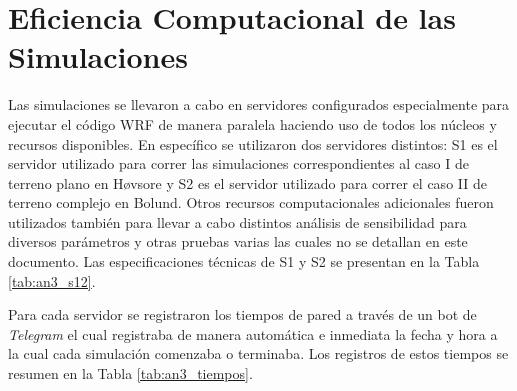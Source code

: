 \chapter{Eficiencia Computacional de las Simulaciones}
\label{apB}
Las simulaciones se llevaron a cabo en servidores configurados especialmente para ejecutar el código WRF de manera paralela haciendo uso de todos los núcleos y recursos disponibles. En específico se utilizaron dos servidores distintos: S1 es el servidor utilizado para correr las simulaciones correspondientes al caso I de terreno plano en Høvsore y S2 es el servidor utilizado para correr el caso II de terreno complejo en Bolund. Otros recursos computacionales adicionales fueron utilizados también para llevar a cabo distintos análisis de sensibilidad para diversos parámetros y otras pruebas varias las cuales no se detallan en este documento. Las especificaciones técnicas de S1 y S2 se presentan en la Tabla \ref{tab:an3_s12}.

\begin{table}[H]
	\caption{Específicaciones técnicas de los recursos computacionales utilizados.}\label{tab:an3_s12}
	\centering{}
\end{table}

Para cada servidor se registraron los tiempos de pared a través de un bot de \emph{Telegram} el cual registraba de manera automática e inmediata la fecha y hora a la cual cada simulación comenzaba o terminaba. Los registros de estos tiempos se resumen en la Tabla \ref{tab:an3_tiempos}.
\newpage
\begin{table}[H]
	\caption{Tiempos de cálculo para cada experimento.}\label{tab:an3_tiempos}
	\centering{}
\end{table}

